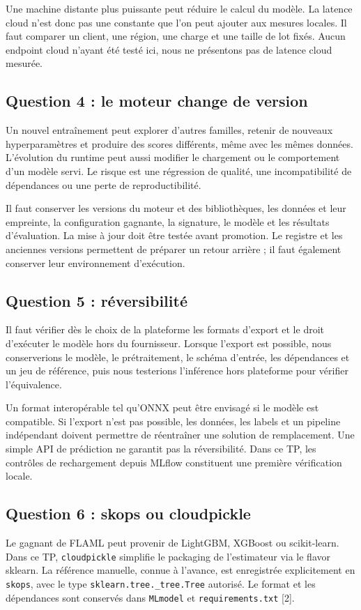 \documentclass[11pt,a4paper]{article}
\begin{document}
Une machine distante plus puissante peut réduire le calcul du modèle. La latence cloud n'est donc pas une constante que l'on peut ajouter aux mesures locales. Il faut comparer un client, une région, une charge et une taille de lot fixés. Aucun endpoint cloud n'ayant été testé ici, nous ne présentons pas de latence cloud mesurée.

\clearpage
\subsection*{Question 4 : le moteur change de version}
Un nouvel entraînement peut explorer d'autres familles, retenir de nouveaux hyperparamètres et produire des scores différents, même avec les mêmes données. L'évolution du runtime peut aussi modifier le chargement ou le comportement d'un modèle servi. Le risque est une régression de qualité, une incompatibilité de dépendances ou une perte de reproductibilité.

Il faut conserver les versions du moteur et des bibliothèques, les données et leur empreinte, la configuration gagnante, la signature, le modèle et les résultats d'évaluation. La mise à jour doit être testée avant promotion. Le registre et les anciennes versions permettent de préparer un retour arrière ; il faut également conserver leur environnement d'exécution.

\subsection*{Question 5 : réversibilité}
Il faut vérifier dès le choix de la plateforme les formats d'export et le droit d'exécuter le modèle hors du fournisseur. Lorsque l'export est possible, nous conserverions le modèle, le prétraitement, le schéma d'entrée, les dépendances et un jeu de référence, puis nous testerions l'inférence hors plateforme pour vérifier l'équivalence.

Un format interopérable tel qu'ONNX peut être envisagé si le modèle est compatible. Si l'export n'est pas possible, les données, les labels et un pipeline indépendant doivent permettre de réentraîner une solution de remplacement. Une simple API de prédiction ne garantit pas la réversibilité. Dans ce TP, les contrôles de rechargement depuis MLflow constituent une première vérification locale.

\subsection*{Question 6 : skops ou cloudpickle}
Le gagnant de FLAML peut provenir de LightGBM, XGBoost ou scikit-learn. Dans ce TP, \texttt{cloudpickle} simplifie le packaging de l'estimateur via le flavor sklearn. La référence manuelle, connue à l'avance, est enregistrée explicitement en \texttt{skops}, avec le type \texttt{sklearn.tree.\_tree.Tree} autorisé. Le format et les dépendances sont conservés dans \texttt{MLmodel} et \texttt{requirements.txt} [2].
\end{document}
